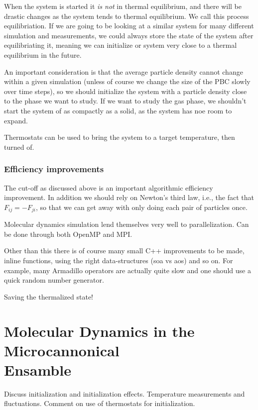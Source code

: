 \documentclass[a4paper, 11pt, notitlepage, english]{article}
\begin{document}
When the system is started it \emph{is not} in thermal equilibrium, and there will be drastic changes as the system tends to thermal equilibrium. We call this process equilibriation. If we are going to be looking at a similar system for many different simulation and measurements, we could always store the state of the system after equilibriating it, meaning we can initialize or system very close to a thermal equilibrium in the future.

An important consideration is that the average particle density cannot change within a given simulation (unless of course we change the size of the PBC slowly over time steps), so we should initialize the system with a particle density close to the phase we want to study. If we want to study the gas phase, we shouldn't start the system of as compactly as a solid, as the system has noe room to expand.

Thermostats can be used to bring the system to a target temperature, then turned of.

\subsubsection*{Efficiency improvements}

The cut-off as discussed above is an important algorithmic efficiency improvement. In addition we should rely on Newton's third law, i.e., the fact that $F_{ij} = -F_{ji}$, so that we can get away with only doing each pair of particles once. 

Molecular dynamics simulation lend themselves very well to parallelization. Can be done through both OpenMP and MPI.

Other than this there is of course many small C++ improvements to be made, inline functions, using the right data-structures (soa vs aos) and so on. For example, many Armadillo operators are actually quite slow and one should use a quick random number generator.

Saving the thermalized state!

\clearpage


\section{Molecular Dynamics in the Microcannonical \\ Ensamble}

Discuss initialization and initialization effects. Temperature measurements and
fluctuations. Comment on use of thermostats for initialization.
\end{document}
